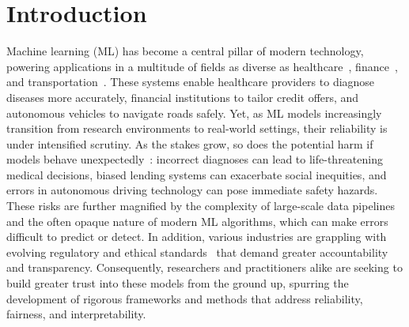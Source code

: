 




\chapter{Introduction}
\label{ch:introduction}

\noindent Machine learning (ML) has become a central pillar of modern technology, powering applications in a multitude of fields as diverse as healthcare~\citep{kotropoulos2009linear,sousa2009ordinal, challen2019artificial,guan2020bounded, mozannar2020consistent}, finance~\citep{9260038}, and transportation~\citep{ghodsi2021generating, tselentis2023usefulness}. These systems enable healthcare providers to diagnose diseases more accurately, financial institutions to tailor credit offers, and autonomous vehicles to navigate roads safely. Yet, as ML models increasingly transition from research environments to real-world settings, their reliability is under intensified scrutiny. As the stakes grow, so does the potential harm if models behave unexpectedly~\citep{amodei2016concrete, wiens2019no}: incorrect diagnoses can lead to life-threatening medical decisions, biased lending systems can exacerbate social inequities, and errors in autonomous driving technology can pose immediate safety hazards. These risks are further magnified by the complexity of large-scale data pipelines~\citep{pervaiz2019examining} and the often opaque nature of modern ML algorithms, which can make errors difficult to predict or detect. In addition, various industries are grappling with evolving regulatory and ethical standards~\citep{lo2020ethical, yaghini2024regulation} that demand greater accountability and transparency. Consequently, researchers and practitioners alike are seeking to build greater trust into these models from the ground up, spurring the development of rigorous frameworks and methods that address reliability, fairness, and interpretability.

